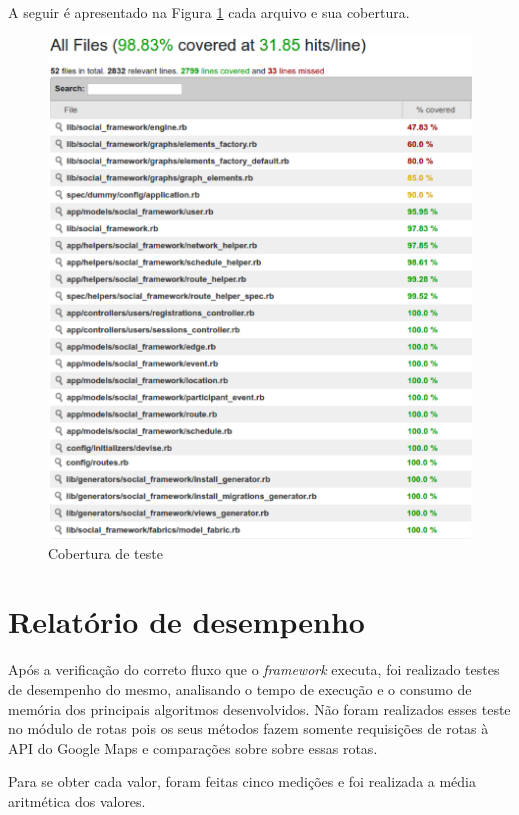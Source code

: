 A seguir é apresentado na Figura \ref{Cobertura_teste} cada arquivo e sua cobertura.

\begin{figure}[!h]
	\centering
	\includegraphics[scale=0.60]{figuras/resultados/cobertura.eps}
	\caption[Cobertura de teste]{Cobertura de teste}
	\label{Cobertura_teste}
\end{figure}

\section{Relatório de desempenho}

Após a verificação do correto fluxo que o \textit{framework} executa, foi realizado testes de desempenho do mesmo, analisando o tempo de execução e o consumo de memória dos principais algoritmos desenvolvidos. Não foram realizados esses teste no módulo de rotas pois os seus métodos fazem somente requisições de rotas à API do Google Maps e comparações sobre sobre essas rotas.

Para se obter cada valor, foram feitas cinco medições e foi realizada a média aritmética dos valores.

